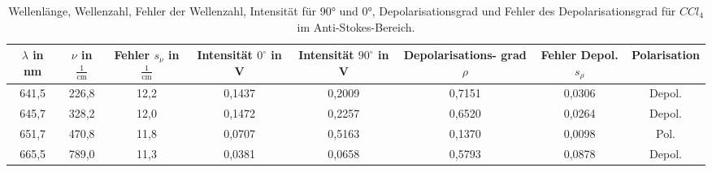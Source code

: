 \begin{table}[h]
    \centering
    \begin{tabular}{c||c|c|c|c|c|c|c}
      \makecell{ $\lambda$ \\in nm} & $\nu$ in $\frac{1}{\text{cm}}$  & \makecell{ Fehler \\ $s_{\nu}$ in $\frac{1}{\text{cm}}$} & \makecell{Intensität\\ $0^{\circ}$ in V}  &  \makecell{Intensität\\ $90^{\circ}$ in V}  & \makecell{ Depolarisations- \\ grad $\rho$}  & \makecell{ Fehler \\ Depol. $s_{\rho}$} & Polarisation \\
      \hline
      641,5 & 226,8 & 12,2  & 0,1437 & 0,2009 & 0,7151 & 0,0306 & Depol. \\
      645,7 & 328,2 & 12,0  & 0,1472 & 0,2257 & 0,6520 & 0,0264 & Depol. \\
      651,7 & 470,8 & 11,8  & 0,0707 & 0,5163 & 0,1370 & 0,0098 & Pol. \\
      665,5 & 789,0 & 11,3  & 0,0381 & 0,0658 & 0,5793 & 0,0878 & Depol. \\  
    \end{tabular}
    \caption{Wellenlänge, Wellenzahl, Fehler der Wellenzahl, Intensität für 90° und 0°, Depolarisationsgrad und Fehler des Depolarisationsgrad für $CCl_4$ im Anti-Stokes-Bereich.}
  \end{table}%